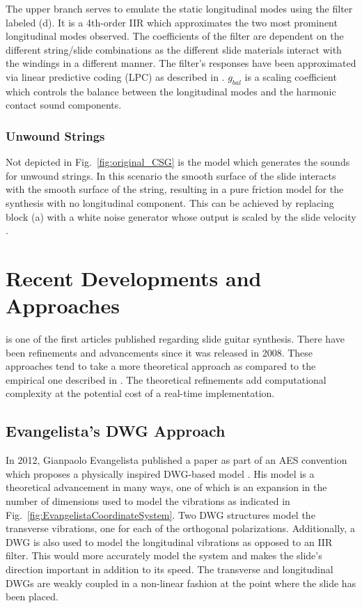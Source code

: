\documentclass[main.tex]{subfiles}
\begin{document}
The upper branch serves to emulate the static longitudinal modes using the filter labeled (d). It is a 4th-order IIR which approximates the two most prominent longitudinal modes observed. The coefficients of the filter are dependent on the different string/slide combinations as the different slide materials interact with the windings in a different manner. The filter's responses have been approximated via linear predictive coding (LPC) as described in . $g_{bal}$ is a scaling coefficient which controls the balance between the longitudinal modes and the harmonic contact sound components.

\subsubsection{Unwound Strings}
Not depicted in Fig.~\ref{fig:original_CSG} is the model which generates the sounds for unwound strings. In this scenario the smooth surface of the slide interacts with the smooth surface of the string, resulting in a pure friction model for the synthesis with no longitudinal component. This can be achieved by replacing block (a) with a white noise generator whose output is scaled by the slide velocity .

\section{Recent Developments and Approaches}
 is one of the first articles published regarding slide guitar synthesis. There have been refinements and advancements since it was released in 2008. These approaches tend to take a more theoretical approach as compared to the empirical one described in . The theoretical refinements add computational complexity at the potential cost of a real-time implementation.

\subsection{Evangelista's DWG Approach}
In 2012, Gianpaolo Evangelista published a paper as part of an AES convention which proposes a physically inspired DWG-based model . His model is a theoretical advancement in many ways, one of which is an expansion in the number of dimensions used to model the vibrations as indicated in Fig.~\ref{fig:EvangelistaCoordinateSystem}. Two DWG structures model the transverse vibrations, one for each of the orthogonal polarizations. Additionally, a DWG is also used to model the longitudinal vibrations as opposed to an IIR filter. This would more accurately model the system and makes the slide's direction important in addition to its speed. The transverse and longitudinal DWGs are weakly coupled in a non-linear fashion at the point where the slide has been placed.
\end{document}
